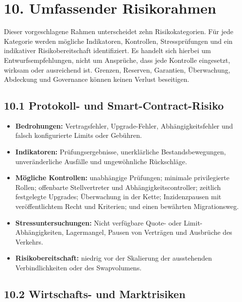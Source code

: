 \documentclass[11pt]{article}
\begin{document}
\section*{10. Umfassender Risikorahmen}

Dieser vorgeschlagene Rahmen unterscheidet zehn Risikokategorien. Für jede Kategorie werden mögliche Indikatoren, Kontrollen, Stressprüfungen und ein indikativer Risikobereitschaft identifiziert. Es handelt sich hierbei um Entwurfsempfehlungen, nicht um Ansprüche, dass jede Kontrolle eingesetzt, wirksam oder ausreichend ist. Grenzen, Reserven, Garantien, Überwachung, Abdeckung und Governance können keinen Verlust beseitigen.

\subsection*{10.1 Protokoll- und Smart-Contract-Risiko}

\begin{itemize}[leftmargin=*]
\item \textbf{Bedrohungen:} Vertragsfehler, Upgrade-Fehler, Abhängigkeitsfehler und falsch konfigurierte Limits oder Gebühren.
\item \textbf{Indikatoren:} Prüfungsergebnisse, unerklärliche Bestandsbewegungen, unveränderliche Ausfälle und ungewöhnliche Rückschläge.
\item \textbf{Mögliche Kontrollen:} unabhängige Prüfungen; minimale privilegierte Rollen; offenbarte Stellvertreter und Abhängigkeitscontroller; zeitlich festgelegte Upgrades; Überwachung in der Kette; Inzidenzpausen mit veröffentlichtem Recht und Kriterien; und einen bewährten Migrationsweg.
\item \textbf{Stressuntersuchungen:} Nicht verfügbare Quote- oder Limit-Abhängigkeiten, Lagermangel, Pausen von Verträgen und Ausbrüche des Verkehrs.
\item \textbf{Risikobereitschaft:} niedrig vor der Skalierung der ausstehenden Verbindlichkeiten oder des Swapvolumens.
\end{itemize}
\subsection*{10.2 Wirtschafts- und Marktrisiken}
\end{document}
